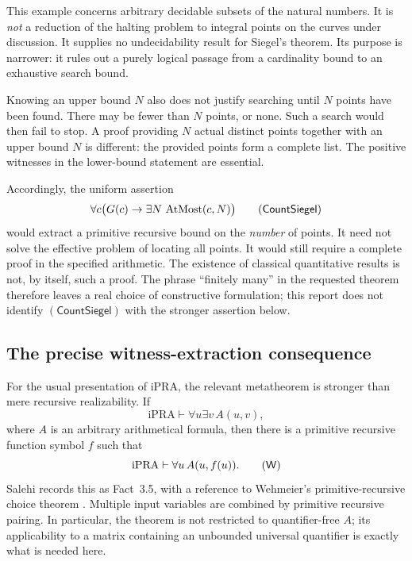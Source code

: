 This example concerns arbitrary decidable subsets of the natural numbers.
It is \emph{not} a reduction of the halting problem to integral points on
the curves under discussion.  It supplies no undecidability result for
Siegel's theorem.  Its purpose is narrower: it rules out a purely logical
passage from a cardinality bound to an exhaustive search bound.

Knowing an upper bound $N$ also does not justify searching until $N$ points
have been found.  There may be fewer than $N$ points, or none.  Such a
search would then fail to stop.  A proof providing $N$ actual distinct
points together with an upper bound $N$ is different: the provided points
form a complete list.  The positive witnesses in the lower-bound statement
are essential.

Accordingly, the uniform assertion
\[
 \forall c\bigl(G(c)\to\exists N\,
                         \operatorname{AtMost}(c,N)\bigr)
 \tag{\textsf{CountSiegel}}
\]
would extract a primitive recursive bound on the \emph{number} of points.
It need not solve the effective problem of locating all points.  It would
still require a complete proof in the specified arithmetic.  The existence
of classical quantitative results is not, by itself, such a proof.  The
phrase ``finitely many'' in the requested theorem therefore leaves a real
choice of constructive formulation; this report does not identify
$(\mathsf{CountSiegel})$ with the stronger assertion below.

\subsection{The precise witness-extraction consequence}

For the usual presentation of iPRA, the relevant metatheorem is stronger
than mere recursive realizability.  If
\[
 \mathrm{iPRA}\vdash\forall u\exists v\,A(u,v),
\]
where $A$ is an arbitrary arithmetical formula, then there is a primitive
recursive function symbol $f$ such that
\[
 \mathrm{iPRA}\vdash\forall u\,A(u,f(u)).
 \tag{\textsf{W}}
\]
Salehi records this as Fact~3.5, with a reference to Wehmeier's
primitive-recursive choice theorem
\cite{Salehi2002,Wehmeier1997}.  Multiple input variables are combined by
primitive recursive pairing.  In particular, the theorem is not restricted
to quantifier-free $A$; its applicability to a matrix containing an
unbounded universal quantifier is exactly what is needed here.

